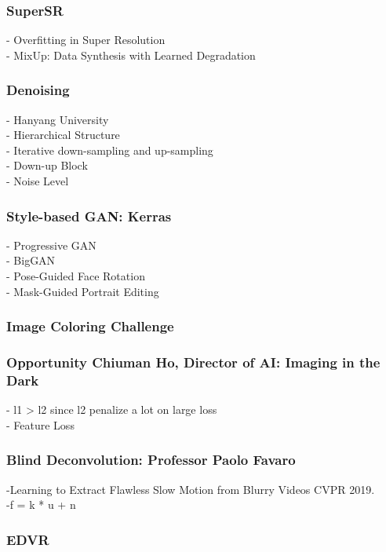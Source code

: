 \subsubsection{SuperSR}
    - Overfitting in Super Resolution\\
    - MixUp: Data Synthesis with Learned Degradation\\
\subsubsection{Denoising}
    - Hanyang University\\
    - Hierarchical Structure\\
    - Iterative down-sampling and up-sampling\\
    - Down-up Block\\
    - Noise Level\\
\subsubsection{Style-based GAN: Kerras}
    - Progressive GAN\\
    - BigGAN\\
    - Pose-Guided Face Rotation\\
    - Mask-Guided Portrait Editing\\

\subsubsection{Image Coloring Challenge}

\subsubsection{Opportunity Chiuman Ho, Director of AI: Imaging in the Dark}
    - l1 > l2 since l2 penalize a lot on large loss\\
    - Feature Loss\\

\subsubsection{Blind Deconvolution: Professor Paolo Favaro}
    -Learning to Extract Flawless Slow Motion from Blurry Videos CVPR 2019.\\
    -f = k * u + n\\
\subsubsection{EDVR}

